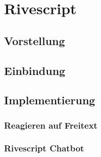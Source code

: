 \chapter{Rivescript}\label{sec:rivescript}
\section{Vorstellung}
\section{Einbindung}
\section{Implementierung}
\subsection{Reagieren auf Freitext}
\subsection{Rivescript Chatbot}
